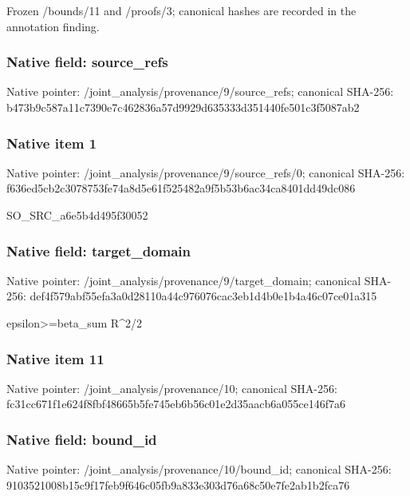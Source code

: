 \documentclass[10pt,a4paper]{article}
\begin{document}
\begingroup\raggedright\sloppy Frozen /\allowbreak{}bounds/\allowbreak{}11 and /\allowbreak{}proofs/\allowbreak{}3;\allowbreak{} canonical hashes are recorded in the annotation finding.\par\endgroup

\subsubsection{Native field: source\_\allowbreak{}refs}
Native pointer: /joint\_\allowbreak{}analysis/provenance/9/source\_\allowbreak{}refs; canonical SHA-256: b473b9c587a11c7390e7c462836a57d9929d635333d351440fe501c3f5087ab2

\subsubsection{Native item 1}
Native pointer: /joint\_\allowbreak{}analysis/provenance/9/source\_\allowbreak{}refs/0; canonical SHA-256: f636ed5cb2c3078753fe74a8d5e61f525482a9f5b53b6ac34ca8401dd49dc086

\begingroup\raggedright\sloppy SO\_\allowbreak{}SRC\_\allowbreak{}a6e5b4d495f30052\par\endgroup

\subsubsection{Native field: target\_\allowbreak{}domain}
Native pointer: /joint\_\allowbreak{}analysis/provenance/9/target\_\allowbreak{}domain; canonical SHA-256: def4f579abf55efa3a0d28110a44c976076cac3eb1d4b0e1b4a46c07ce01a315

\begingroup\raggedright\sloppy epsilon>=\allowbreak{}beta\_\allowbreak{}sum R\textasciicircum{}2/\allowbreak{}2\par\endgroup

\subsubsection{Native item 11}
Native pointer: /joint\_\allowbreak{}analysis/provenance/10; canonical SHA-256: fc31cc671f1e624f8fbf48665b5fe745eb6b56c01e2d35aacb6a055ce146f7a6

\subsubsection{Native field: bound\_\allowbreak{}id}
Native pointer: /joint\_\allowbreak{}analysis/provenance/10/bound\_\allowbreak{}id; canonical SHA-256: 9103521008b15c9f17feb9f646c05fb9a833e303d76a68c50e7fe2ab1b2fca76
\end{document}
